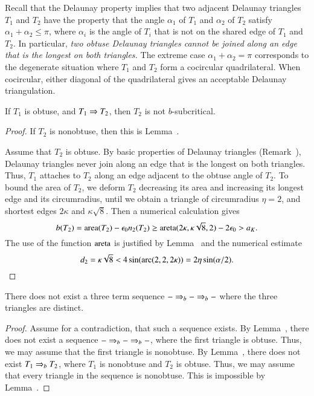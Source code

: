 \begin{remark}
  Recall that the Delaunay property implies that two adjacent Delaunay
  triangles $T_1$ and $T_2$ have the property that the angle
  $\alpha_1$ of $T_1$ and $\alpha_2$ of $T_2$ satisfy $\alpha_1 +
  \alpha_2\le \pi$, where $\alpha_i$ is the angle of $T_i$ that is not
  on the shared edge of $T_1$ and $T_2$.  In particular, {\it two
    obtuse Delaunay triangles cannot be joined along an edge that is
    the longest on both triangles.}  The extreme case
  $\alpha_1+\alpha_2=\pi$ corresponds to the degenerate situation
  where $T_1$ and $T_2$ form a cocircular quadrilateral. When
  cocircular, either diagonal of the quadrilateral gives an acceptable
  Delaunay triangulation.
\end{remark}



\begin{lemma}
  If $T_1$ is obtuse, and $T_1 \Rightarrow T_2$, then $T_2$ is not
  $b$-subcritical.
\end{lemma}


\begin{proof}  If $T_2$ is nonobtuse, then this is Lemma~.

Assume that $T_2$ is obtuse.  By basic properties of Delaunay
triangles (Remark~), Delaunay triangles never join
along an edge that is the longest on both triangles.  Thus, $T_1$
attaches to $T_2$ along an edge adjacent to the obtuse angle of $T_2$.
To bound the area of $T_2$, we deform $T_2$ decreasing its area and
increasing its longest edge and its circumradius, until we obtain a
triangle of circumradius $\eta=2$, and shortest edges $2\kappa$ and
$\kappa\sqrt{8}$.  Then a numerical calculation gives
\[
b(T_2) = {\operatorname{area}}(T_2) - \epsilon_0 n_2(T_2) \ge 
{\operatorname{areta}}(2\kappa,\kappa\sqrt{8},2) - 2\epsilon_0 > a_K.
\] %
The use of the function ${\operatorname{areta}}$ is justified by
Lemma~ and the numerical estimate
\[
d_2 = \kappa\sqrt8 <  4 \sin(\operatorname{arc}(2,2,2\kappa)) = 2\eta\sin(\alpha/2).
\] %
\end{proof}


\begin{lemma}  There does not exist a three
term sequence $- \Rightarrow_{b} -\Rightarrow_{b} -$ where  the three triangles  are distinct.
\end{lemma}

\begin{proof}  
Assume for a contradiction, that such a sequence exists.
By Lemma~, there does not exist a sequence $- \Rightarrow_{b} - \Rightarrow_{b} -$,
where the first triangle is obtuse.  Thus, we may assume that the first
triangle is nonobtuse.
By Lemma~, there does not exist $T_1\Rightarrow_{b} T_2$,
where $T_1$ is nonobtuse and $T_2$ is obtuse.  Thus, we may assume
that every triangle in the sequence is nonobtuse.  This is impossible by
Lemma~.
\end{proof}

